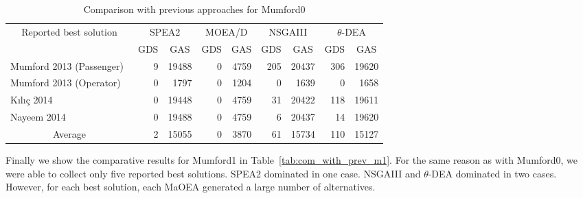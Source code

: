 \begin{table}[!htbp]
	\centering
	\caption{Comparison with previous approaches for Mumford0}
	\begin{tabular}{|l|r|r||r|r||r|r||r|r|}
		\hline
		\multicolumn{1}{|c|}{\multirow{2}[4]{*}{Reported best solution}} & \multicolumn{2}{c||}{SPEA2} & \multicolumn{2}{c||}{MOEA/D} & \multicolumn{2}{c||}{NSGAIII} & \multicolumn{2}{c|}{$\theta$-DEA} \\
		\cline{2-9}    \multicolumn{1}{|c|}{} & \multicolumn{1}{c|}{GDS} & \multicolumn{1}{c||}{GAS} & \multicolumn{1}{c|}{GDS} & \multicolumn{1}{c||}{GAS} & \multicolumn{1}{c|}{GDS} & \multicolumn{1}{c||}{GAS} & \multicolumn{1}{c|}{GDS} & \multicolumn{1}{c|}{GAS} \\
		\hline
		Mumford 2013 (Passenger)~\cite{mumford2013new} & 9     & 19488 & 0     & 4759  & 205   & 20437 & 306   & 19620 \\
		\hline
		Mumford 2013 (Operator)~\cite{mumford2013new} & 0     & 1797  & 0     & 1204  & 0     & 1639  & 0     & 1658 \\
		\hline
		K{\i}l{\i}{\c{c}} 2014~\cite{kilicc2014demand} & 0     & 19448 & 0     & 4759  & 31    & 20422 & 118   & 19611 \\
		\hline
		Nayeem 2014~\cite{nayeem2014transit} & 0     & 19488 & 0     & 4759  & 6     & 20437 & 14    & 19620 \\
		\hline
		\hline
		\multicolumn{1}{|c|}{Average} & 2     & 15055 & 0     & 3870  & 61    & 15734 & 110   & 15127 \\
		\hline
	\end{tabular}%
	\label{tab:com_with_prev_m0}%
\end{table}%

Finally we show the comparative results for Mumford1 in Table~\ref{tab:com_with_prev_m1}. For the same reason as with Mumford0, we were able to collect only five reported best solutions. SPEA2 dominated in one case. NSGAIII and $\theta$-DEA dominated in two cases. However, for each best solution, each MaOEA generated a large number of alternatives.

